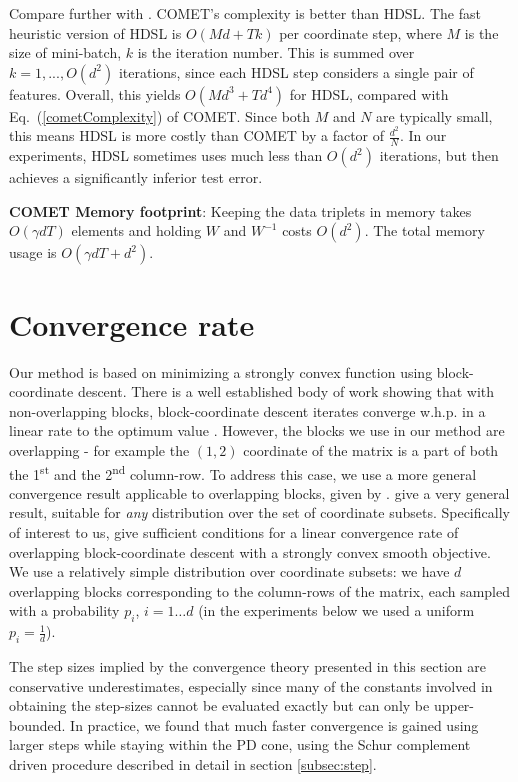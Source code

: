 \documentclass{article} %
\newcommand\mat[1]{{#1}}
\newcommand{\W}{\mat{W}}
\renewcommand{\eqref}[1]{Eq.~(\ref{#1})}
\begin{document}
Compare further with \citet{hdsl}. COMET’s complexity is better than HDSL. The fast heuristic version of HDSL is $O(Md+Tk)$ per coordinate step, where $M$ is the size of mini-batch, $k$ is the iteration number. This is summed over $k=1,...,O(d^2)$ iterations, since each HDSL step considers a single pair of features. Overall, this yields $O(Md^3+Td^4)$ for HDSL, compared with \eqref{cometComplexity} of COMET. Since both $M$ and $N$ are typically small, this means HDSL is more costly than COMET by a factor of $\frac{d^2}{N}$. In our experiments, HDSL sometimes uses much less than $O(d^2)$ iterations, but then achieves a significantly inferior test error.

{\bf COMET Memory footprint}: Keeping the data triplets in memory takes $O(\gamma d T)$ elements and holding $\W$ and $\W^{-1}$ costs $O(d^2)$. The total memory usage is $O(\gamma d T + d^2)$. 

\section{Convergence rate}
Our method is based on minimizing a strongly convex function using block-coordinate descent. There is a well established body of work showing that with non-overlapping blocks, block-coordinate descent iterates converge w.h.p. in a linear rate to the optimum value \cite{nesterov2012efficiency,richtarik2014iteration}.
However, the blocks we use in our method are overlapping - for example the $(1,2)$ coordinate of the matrix is a part of both the 1\textsuperscript{st} and the 2\textsuperscript{nd} column-row. To address this case, we use a more general convergence result applicable to overlapping blocks, given by \citet{richtarik2013optimal}. \citeauthor{richtarik2013optimal} give a very general result, suitable for \emph{any} distribution over the set of coordinate subsets. 
Specifically of interest to us, \citeauthor{richtarik2013optimal} give sufficient conditions for a linear convergence rate of overlapping block-coordinate descent with a strongly convex smooth objective. 
We use a relatively simple distribution over coordinate subsets: we have $d$ overlapping blocks corresponding to the column-rows of the matrix, each sampled with a probability $p_i$, $i=1 \ldots d$ (in the experiments below we used a uniform $p_i = \frac{1}{d}$).

The step sizes implied by the convergence theory presented in this section are conservative underestimates, especially since many of the constants involved in obtaining the step-sizes cannot be evaluated exactly but can only be upper-bounded. In practice, we found that much faster convergence is gained using larger steps while staying within the PD cone, using the Schur complement driven procedure described in detail in section \ref{subsec:step}.
\end{document}
